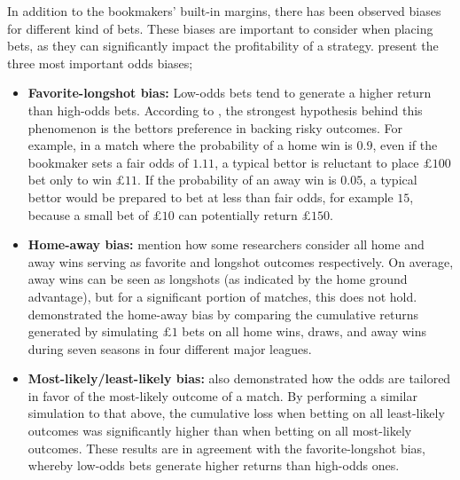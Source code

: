 In addition to the bookmakers' built-in margins, there has been observed biases for different kind of bets. These biases are important to consider when placing bets, as they can significantly impact the profitability of a strategy. \citet{bib:constantinou-fenton-2013} present the three most important odds biases;
\begin{itemize}
    \item \textbf{Favorite-longshot bias:} Low-odds bets tend to generate a higher return than high-odds bets. According to \citet{bib:constantinou-fenton-2013}, the strongest hypothesis behind this phenomenon is the bettors preference in backing risky outcomes. For example, in a match where the probability of a home win is $0.9$, even if the bookmaker sets a fair odds of $1.11$, a typical bettor is reluctant to place $\pounds 100$ bet only to win $\pounds 11$. If the probability of an away win is $0.05$, a typical bettor would be prepared to bet at less than fair odds, for example $15$, because a small bet of $\pounds 10$ can potentially return $\pounds 150$. 
    
    \item \textbf{Home-away bias:} \citet{bib:constantinou-fenton-2013} mention how some researchers consider all home and away wins serving as favorite and longshot outcomes respectively. On average, away wins can be seen as longshots (as indicated by the home ground advantage), but for a significant portion of matches, this does not hold. \citet{bib:constantinou-fenton-2013} demonstrated the home-away bias by comparing the cumulative returns generated by simulating $\pounds 1$ bets on all home wins, draws, and away wins during seven seasons in four different major leagues.
    
    \item \textbf{Most-likely/least-likely bias:} \citet{bib:constantinou-fenton-2013} also demonstrated how the odds are tailored in favor of the most-likely outcome of a match. By performing a similar simulation to that above, the cumulative loss when betting on all least-likely outcomes was significantly higher than when betting on all most-likely outcomes. These results are in agreement with the favorite-longshot bias, whereby low-odds bets generate higher returns than high-odds ones.
\end{itemize}